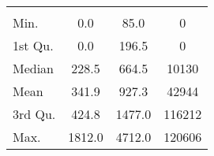 \begin{tabular}{lS[table-format=5.1]S[table-format=5.1]S[table-format=5.1]}
&  &  &  \\
 Min.    & 0.0 & 85.0 & 0 \\
 1st Qu. & 0.0 & 196.5 & 0 \\
 Median  & 228.5 & 664.5 & 10130 \\
 Mean    & 341.9 & 927.3 & 42944 \\
 3rd Qu. & 424.8 & 1477.0 & 116212 \\
 Max.    & 1812.0 & 4712.0 & 120606 \\
\end{tabular}
